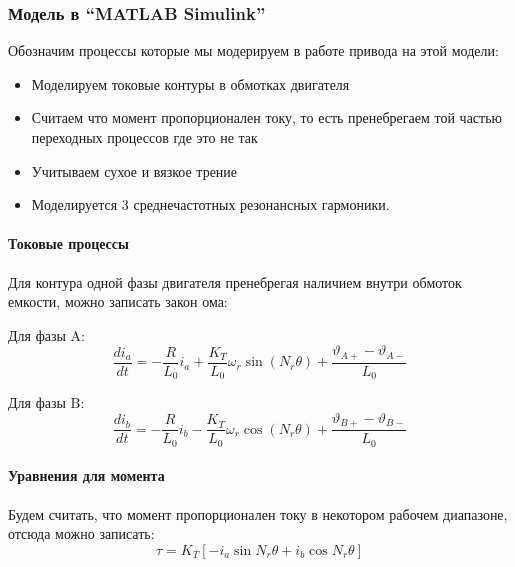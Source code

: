 \subsubsection{Модель в ``MATLAB Simulink''}
Обозначим процессы которые мы модерируем в работе привода на этой модели:

\begin{itemize}
    \item Моделируем токовые контуры в обмотках двигателя
    \item Считаем что момент пропорционален току, то есть пренебрегаем той частью переходных
            процессов где это не так
    \item Учитываем сухое и вязкое трение
    \item Моделируется 3 среднечастотных резонансных гармоники. %
\end{itemize}

\paragraph{ Токовые процессы }
Для контура одной фазы двигателя пренебрегая наличием внутри обмоток емкости, можно записать
закон ома:

Для фазы A:
\begin{equation}
    \frac{di_{a}}{dt} = 
        - \frac{R}{L_{0}} i_{a}
        + \frac{K_{T}}{L_{0}} \omega_{r} \sin(N_{r}\theta)
        + \frac{\vartheta_{A+} - \vartheta_{A-}}{L_{0}}
\end{equation}

Для фазы B:
\begin{equation}
    \frac{di_{b}}{dt} = 
        - \frac{R}{L_{0}} i_{b}
        - \frac{K_{T}}{L_{0}} \omega_{r} \cos(N_{r}\theta)
        + \frac{\vartheta_{B+} - \vartheta_{B-}}{L_{0}}
\end{equation}

\paragraph{ Уравнения для момента }
Будем считать, что момент пропорционален току в некотором рабочем диапазоне, отсюда можно записать:
\begin{equation}
    \tau = K_{T} [-i_{a} \sin{N_{r}\theta} + i_{b} \cos{N_{r}\theta}]
\end{equation}

